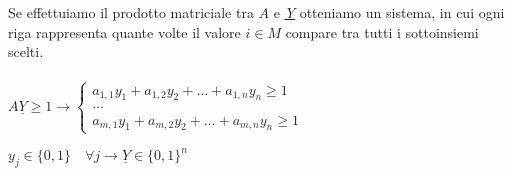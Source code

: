 \documentclass[12pt, twoside, letterpaper]{article}
\begin{document}
{				Se effettuiamo il prodotto matriciale tra $A$ e \underline{\textit{Y}} otteniamo un sistema, in cui ogni riga rappresenta quante volte il valore $i \in M$ compare tra tutti i sottoinsiemi scelti.\\\\
				$ A \underline{Y} \geq 1 \rightarrow \begin{cases} a_{1,1} y_1 + a_{1,2}y_2 + \dots + a_{1,n} y_n \geq 1 \\ \dots \\ a_{m,1} y_1 + a_{m,2}y_2 + \dots + a_{m,n} y_n \geq 1 \end{cases}$
				\item $y_j \in \{0,1\} \quad \forall j \rightarrow \underline{Y} \in \{0,1\}^n$ 
			}
\end{document}
